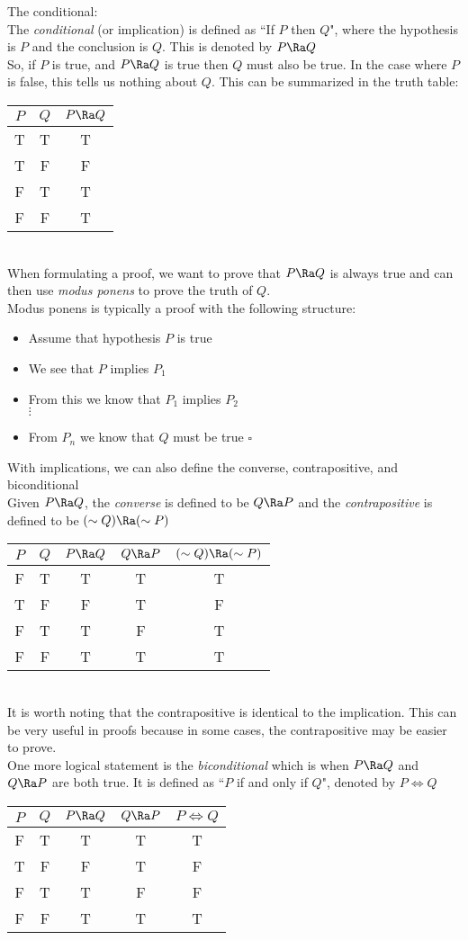 The conditional:\\
The \textit{conditional} (or implication) is defined as ``If $P$ then $Q$", where the hypothesis is $P$ and the conclusion is $Q$. This is denoted by $P\Ra Q$\\
So, if $P$ is true, and $P\Ra Q$ is true then $Q$ must also be true. In the case where $P$ is false, this tells us nothing about $Q$. This can be summarized in the truth table:\\
\begin{tabular}{c|c|c}
    $P$ & $Q$ & $P\Ra Q$\\
    \hline
    T & T & T\\
    T & F & F\\
    F & T & T\\
    F & F & T
\end{tabular}\\
When formulating a proof, we want to prove that $P\Ra Q$ is always true and can then use \textit{modus ponens} to prove the truth of $Q$.\\
Modus ponens is typically a proof with the following structure:
\begin{itemize}
    \item Assume that hypothesis $P$ is true
    \item We see that $P$ implies $P_1$
    \item From this we know that $P_1$ implies $P_2$\\
    $\vdots$
    \item From $P_n$ we know that $Q$ must be true $\square$
\end{itemize}
With implications, we can also define the converse, contrapositive, and biconditional\\
Given $P\Ra Q$, the \textit{converse} is defined to be $Q\Ra P$ and the \textit{contrapositive} is defined to be $(\sim Q)\Ra (\sim P)$\\
\begin{tabular}{c|c||c|c|c}
    $P$ & $Q$ & $P\Ra Q$ & $Q\Ra P$ & $(\sim Q)\Ra (\sim P)$\\
    \hline
    F & T & T & T & T\\
    T & F & F & T & F\\
    F & T & T & F & T\\
    F & F & T & T & T
\end{tabular}\\
It is worth noting that the contrapositive is identical to the implication. This can be very useful in proofs because in some cases, the contrapositive may be easier to prove.\\
One more logical statement is the \textit{biconditional} which is when $P\Ra Q$ and $Q\Ra P$ are both true. It is defined as ``$P$ if and only if $Q$", denoted by $P\Leftrightarrow Q$\\
\begin{tabular}{c|c||c|c|c}
    $P$ & $Q$ & $P\Ra Q$ & $Q\Ra P$ & $P\Leftrightarrow Q$\\
    \hline
    F & T & T & T & T\\
    T & F & F & T & F\\
    F & T & T & F & F\\
    F & F & T & T & T
\end{tabular}\\